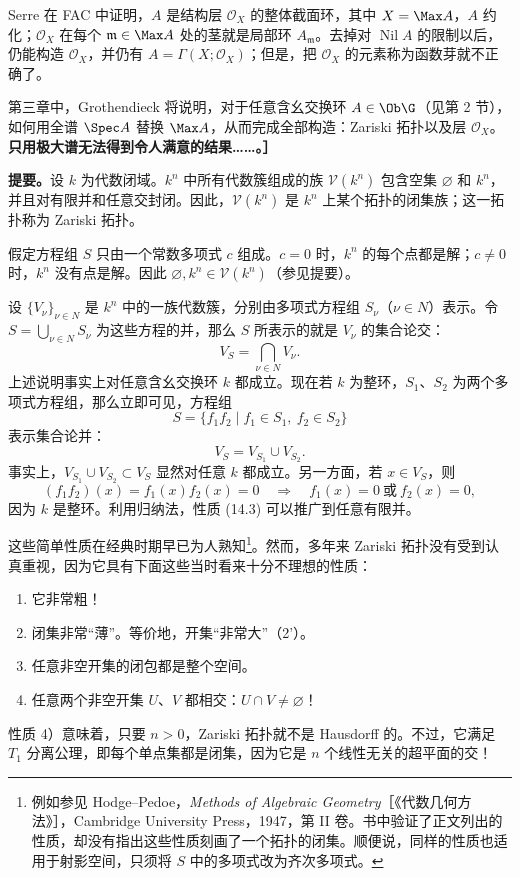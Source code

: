 Serre 在 FAC 中证明，$A$ 是结构层 $\mathcal O_X$ 的整体截面环，其中 $X=\Max A$，$A$ 约化；$\mathcal O_X$ 在每个 $\mathfrak m\in\Max A$ 处的茎就是局部环 $A_{\mathfrak m}$。去掉对 $\operatorname{Nil}A$ 的限制以后，仍能构造 $\mathcal O_X$，并仍有 $A=\Gamma(X;\mathcal O_X)$；但是，把 $\mathcal O_X$ 的元素称为函数芽就不正确了。

第三章中，Grothendieck 将说明，对于任意含幺交换环 $A\in\Ob\G$（见第 2 节），如何用全谱 $\Spec A$ 替换 $\Max A$，从而完成全部构造：Zariski 拓扑以及层 $\mathcal O_X$。
\textbf{只用极大谱无法得到令人满意的结果……。］}

\textbf{提要。}设 $k$ 为代数闭域。$k^n$ 中所有代数簇组成的族 $\mathcal V(k^n)$ 包含空集 $\varnothing$ 和 $k^n$，并且对有限并和任意交封闭。因此，$\mathcal V(k^n)$ 是 $k^n$ 上某个拓扑的闭集族；这一拓扑称为 Zariski 拓扑。

假定方程组 $S$ 只由一个常数多项式 $c$ 组成。$c=0$ 时，$k^n$ 的每个点都是解；$c\ne0$ 时，$k^n$ 没有点是解。因此 $\varnothing,k^n\in\mathcal V(k^n)$（参见提要）。

设 $\{V_\nu\}_{\nu\in N}$ 是 $k^n$ 中的一族代数簇，分别由多项式方程组 $S_\nu$（$\nu\in N$）表示。令 $S=\bigcup_{\nu\in N}S_\nu$ 为这些方程的并，那么 $S$ 所表示的就是 $V_\nu$ 的集合论交：
\begin{equation}\tag{14.1}V_S=\bigcap_{\nu\in N}V_\nu.
\end{equation}
上述说明事实上对任意含幺交换环 $k$ 都成立。现在若 $k$ 为整环，$S_1$、$S_2$ 为两个多项式方程组，那么立即可见，方程组
\begin{equation}\tag{14.2}S=\{f_1f_2\mid f_1\in S_1,\ f_2\in S_2\}
\end{equation}
表示集合论并：
\begin{equation}\tag{14.3}V_S=V_{S_1}\cup V_{S_2}.
\end{equation}
事实上，$V_{S_1}\cup V_{S_2}\subset V_S$ 显然对任意 $k$ 都成立。另一方面，若 $x\in V_S$，则
\begin{equation}\tag{14.4}(f_1f_2)(x)=f_1(x)f_2(x)=0\quad\Longrightarrow\quad f_1(x)=0\ \text{或}\ f_2(x)=0,
\end{equation}
因为 $k$ 是整环。利用归纳法，性质 (14.3) 可以推广到任意有限并。

这些简单性质在经典时期早已为人熟知\footnote{例如参见 Hodge--Pedoe，\textit{Methods of Algebraic Geometry}［《代数几何方法》］，Cambridge University Press，1947，第 II 卷。书中验证了正文列出的性质，却没有指出这些性质刻画了一个拓扑的闭集。顺便说，同样的性质也适用于射影空间，只须将 $S$ 中的多项式改为齐次多项式。}。然而，多年来 Zariski 拓扑没有受到认真重视，因为它具有下面这些当时看来十分不理想的性质：
\begin{enumerate}[label=\arabic*)]
\item 它非常粗！
\item 闭集非常“薄”。等价地，开集“非常大”（2'）。
\item 任意非空开集的闭包都是整个空间。
\item 任意两个非空开集 $U$、$V$ 都相交：$U\cap V\ne\varnothing$！
\end{enumerate}
性质 4）意味着，只要 $n>0$，Zariski 拓扑就不是 Hausdorff 的。不过，它满足 $T_1$ 分离公理，即每个单点集都是闭集，因为它是 $n$ 个线性无关的超平面的交！

